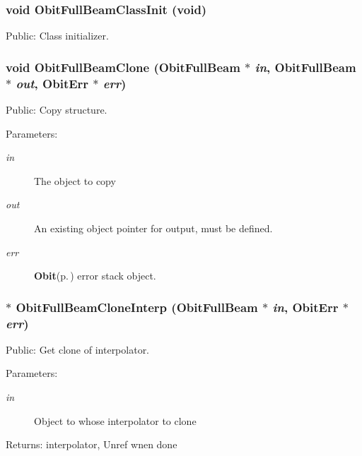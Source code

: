 \subsubsection{\setlength{\rightskip}{0pt plus 5cm}void Obit\-Full\-Beam\-Class\-Init (void)}\label{ObitFullBeam_8h_a8}


Public: Class initializer. 

\subsubsection{\setlength{\rightskip}{0pt plus 5cm}void Obit\-Full\-Beam\-Clone ({\bf Obit\-Full\-Beam} $\ast$ {\em in}, {\bf Obit\-Full\-Beam} $\ast$ {\em out}, {\bf Obit\-Err} $\ast$ {\em err})}\label{ObitFullBeam_8h_a12}


Public: Copy structure. 

\begin{Desc}
\item[Parameters:]
\begin{description}
\item[{\em in}]The object to copy \item[{\em out}]An existing object pointer for output, must be defined. \item[{\em err}]{\bf Obit}{\rm (p.\,\pageref{structObit})} error stack object. \end{description}
\end{Desc}
\subsubsection{$\ast$ Obit\-Full\-Beam\-Clone\-Interp ({\bf Obit\-Full\-Beam} $\ast$ {\em in}, {\bf Obit\-Err} $\ast$ {\em err})}\label{ObitFullBeam_8h_a17}


Public: Get clone of interpolator. 

\begin{Desc}
\item[Parameters:]
\begin{description}
\item[{\em in}]Object to whose interpolator to clone \end{description}
\end{Desc}
\begin{Desc}
\item[Returns:]interpolator, Unref wnen done \end{Desc}
